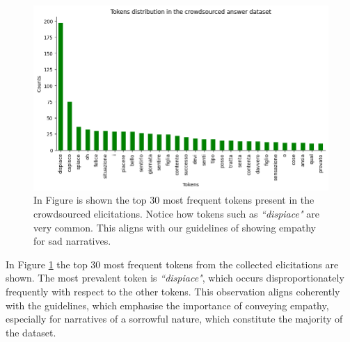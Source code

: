 \begin{figure}[!htbp]
    \centering
    \includegraphics[width=1\linewidth]{assets//imgs/dataset-top-30-answers.png}
    \caption{In Figure is shown the top 30 most frequent tokens present in the crowdsourced elicitations. Notice how tokens such as \emph{``dispiace"} are very common. This aligns with our guidelines of showing empathy for sad narratives. }
    \label{fig:dataset-top-30-answers}
\end{figure}

In Figure \ref{fig:dataset-top-30-answers} the top 30 most frequent tokens from the collected elicitations are shown. The most prevalent token is \emph{``dispiace"}, which occurs disproportionately frequently with respect to the other tokens. This observation aligns coherently with the guidelines, which emphasise the importance of conveying empathy, especially for narratives of a sorrowful nature, which constitute the majority of the dataset.

